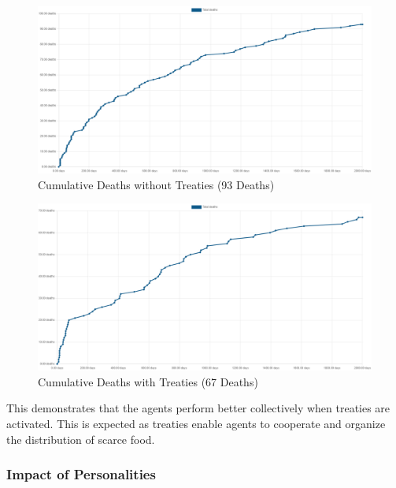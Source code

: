 \begin{figure}[h!]
    \begin{center}
        \includegraphics[scale=0.25]{Images/Cumulative Deaths, WO Treaties, T7Only, 2000days, 20food, 93deaths.png}
    \end{center}
    \caption{Cumulative Deaths without Treaties (93 Deaths)}
    \label{fig: Cumulative Deaths without Treaties}
\end{figure}

\begin{figure}[h!]
    \begin{center}
        \includegraphics[scale=0.25]{Images/Cumulative Deaths, With Treaties, T7Only, 2000days, 20food, 67deaths.png}
    \end{center}
    \caption{Cumulative Deaths with Treaties (67 Deaths)}
    \label{fig: Cumulative Deaths with Treaties}
\end{figure}

This demonstrates that the agents perform better collectively when treaties are activated. This is expected as treaties enable agents to cooperate and organize the distribution of scarce food. 

\newpage
\subsubsection{Impact of Personalities}
\label{subsubsec: Impact of Personalities}

